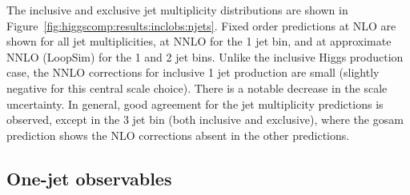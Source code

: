 
The inclusive and exclusive jet multiplicity distributions are shown
in Figure~\ref{fig:higgscomp:results:inclobs:njets}. Fixed order
predictions at NLO are shown for all jet multiplicities, at NNLO for
the 1 jet bin, and at approximate NNLO (LoopSim) for the 1 and 2 jet
bins. Unlike the inclusive Higgs production case, the NNLO corrections
for inclusive 1 jet production are small (slightly negative for this
central scale choice). There is a notable decrease in the scale
uncertainty. In general, good agreement for the jet multiplicity
predictions is observed, except in the 3 jet bin (both inclusive and
exclusive), where the gosam prediction shows the NLO corrections
absent in the other predictions.



\clearpage
\subsection{One-jet observables}
\label{sec:hjetscomp:results:1jobs}

